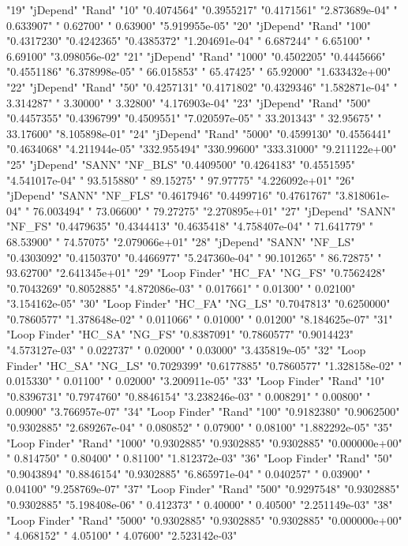 "19" "jDepend" "Rand" "10" "0.4074564" "0.3955217" "0.4171561" "2.873689e-04" "  0.633907" "  0.62700" "  0.63900" "5.919955e-05"
"20" "jDepend" "Rand" "100" "0.4317230" "0.4242365" "0.4385372" "1.204691e-04" "  6.687244" "  6.65100" "  6.69100" "3.098056e-02"
"21" "jDepend" "Rand" "1000" "0.4502205" "0.4445666" "0.4551186" "6.378998e-05" " 66.015853" " 65.47425" " 65.92000" "1.633432e+00"
"22" "jDepend" "Rand" "50" "0.4257131" "0.4171802" "0.4329346" "1.582871e-04" "  3.314287" "  3.30000" "  3.32800" "4.176903e-04"
"23" "jDepend" "Rand" "500" "0.4457355" "0.4396799" "0.4509551" "7.020597e-05" " 33.201343" " 32.95675" " 33.17600" "8.105898e-01"
"24" "jDepend" "Rand" "5000" "0.4599130" "0.4556441" "0.4634068" "4.211944e-05" "332.955494" "330.99600" "333.31000" "9.211122e+00"
"25" "jDepend" "SANN" "NF_BLS" "0.4409500" "0.4264183" "0.4551595" "4.541017e-04" " 93.515880" " 89.15275" " 97.97775" "4.226092e+01"
"26" "jDepend" "SANN" "NF_FLS" "0.4617946" "0.4499716" "0.4761767" "3.818061e-04" " 76.003494" " 73.06600" " 79.27275" "2.270895e+01"
"27" "jDepend" "SANN" "NF_FS" "0.4479635" "0.4344413" "0.4635418" "4.758407e-04" " 71.641779" " 68.53900" " 74.57075" "2.079066e+01"
"28" "jDepend" "SANN" "NF_LS" "0.4303092" "0.4150370" "0.4466977" "5.247360e-04" " 90.101265" " 86.72875" " 93.62700" "2.641345e+01"
"29" "Loop Finder" "HC_FA" "NG_FS" "0.7562428" "0.7043269" "0.8052885" "4.872086e-03" "  0.017661" "  0.01300" "  0.02100" "3.154162e-05"
"30" "Loop Finder" "HC_FA" "NG_LS" "0.7047813" "0.6250000" "0.7860577" "1.378648e-02" "  0.011066" "  0.01000" "  0.01200" "8.184625e-07"
"31" "Loop Finder" "HC_SA" "NG_FS" "0.8387091" "0.7860577" "0.9014423" "4.573127e-03" "  0.022737" "  0.02000" "  0.03000" "3.435819e-05"
"32" "Loop Finder" "HC_SA" "NG_LS" "0.7029399" "0.6177885" "0.7860577" "1.328158e-02" "  0.015330" "  0.01100" "  0.02000" "3.200911e-05"
"33" "Loop Finder" "Rand" "10" "0.8396731" "0.7974760" "0.8846154" "3.238246e-03" "  0.008291" "  0.00800" "  0.00900" "3.766957e-07"
"34" "Loop Finder" "Rand" "100" "0.9182380" "0.9062500" "0.9302885" "2.689267e-04" "  0.080852" "  0.07900" "  0.08100" "1.882292e-05"
"35" "Loop Finder" "Rand" "1000" "0.9302885" "0.9302885" "0.9302885" "0.000000e+00" "  0.814750" "  0.80400" "  0.81100" "1.812372e-03"
"36" "Loop Finder" "Rand" "50" "0.9043894" "0.8846154" "0.9302885" "6.865971e-04" "  0.040257" "  0.03900" "  0.04100" "9.258769e-07"
"37" "Loop Finder" "Rand" "500" "0.9297548" "0.9302885" "0.9302885" "5.198408e-06" "  0.412373" "  0.40000" "  0.40500" "2.251149e-03"
"38" "Loop Finder" "Rand" "5000" "0.9302885" "0.9302885" "0.9302885" "0.000000e+00" "  4.068152" "  4.05100" "  4.07600" "2.523142e-03"
